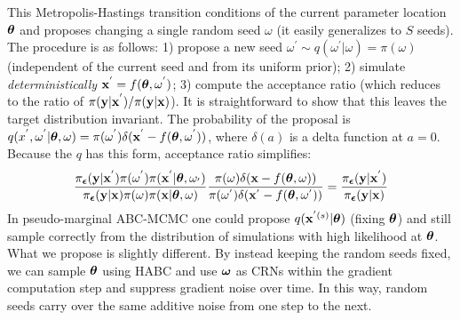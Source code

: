 \documentclass[]{article}
\begin{document}
This Metropolis-Hastings transition conditions of the current parameter location ${\bm \theta}$ and proposes changing a single random seed $\omega$ (it easily generalizes to $S$ seeds).  The procedure is as follows: 1) propose a new seed $\omega^{'} \sim q(\omega^{'} | \omega) = \pi(\omega)$ (independent of the current seed and from its uniform prior); 2) simulate {\em deterministically} ${\bf x}^{'} = f( {\bm \theta}, \omega^{'})$; 3) compute the acceptance ratio (which reduces to the ratio of $\pi({\bf y} | {\bf x}^{'})/\pi({\bf y} | {\bf x})$).   It is straightforward to show that this leaves the target distribution invariant.  The probability of the proposal is $q(x^{'}, \omega^{'} | {\bm \theta}, \omega) = \pi(\omega^{'})\delta( {\bf x}^{'} - f( {\bm \theta}, \omega^{'}))$, where $\delta(a)$ is a delta function at $a=0$.  Because the $q$ has this form, acceptance ratio simplifies:
\begin{equation}
   \frac{\pi_{{\bm {\epsilon}}}({\bf y} | {\bf x}^{'})\pi(\omega^{'}) \pi({\bf x}^{'} | {\bm \theta}, \omega_{'}) }{\pi_{{\bm {\epsilon}}}({\bf y}|{\bf x})\pi(\omega)\pi({\bf x} | {\bm \theta}, \omega)} \frac{\pi(\omega)\delta( {\bf x} - f( {\bm \theta}, \omega))}{\pi(\omega^{'})\delta( {\bf x}^{'} - f( {\bm \theta}, \omega^{'}))} =  \frac{\pi_{{\bm {\epsilon}}}({\bf y} | {\bf x}^{'})}{\pi_{{\bm {\epsilon}}}({\bf y} | {\bf x})}
\end{equation}
In pseudo-marginal ABC-MCMC one could propose $q({\bf x}^{'(s)} | {\bm \theta})$ (fixing ${\bm \theta}$) and still sample correctly from the distribution of simulations with high likelihood at ${\bm \theta}$.  What we propose is slightly different. By instead keeping the random seeds fixed, we can sample ${\bm \theta}$ using HABC and use ${\bm \omega}$ as CRNs within the gradient computation step and suppress gradient noise over time.  In this way, random seeds carry over the same additive noise from one step to the next.
%
\end{document}

